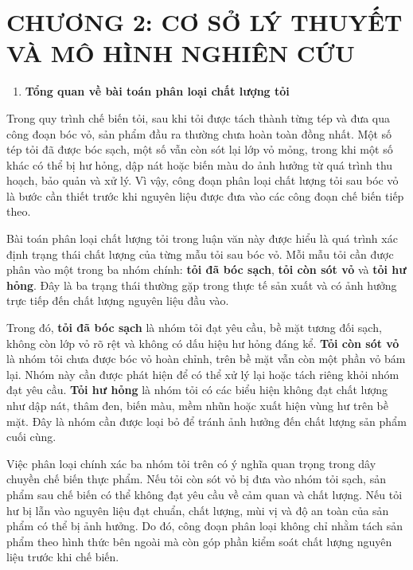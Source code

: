 \documentclass[
]{article}
\begin{document}
\section{\texorpdfstring{CHƯƠNG 2: CƠ SỞ LÝ THUYẾT VÀ MÔ HÌNH NGHIÊN CỨU
}{CHƯƠNG 2: CƠ SỞ LÝ THUYẾT VÀ MÔ HÌNH NGHIÊN CỨU }}\label{chux1b0ux1a1ng-2-cux1a1-sux1edf-luxfd-thuyux1ebft-vuxe0-muxf4-huxecnh-nghiuxean-cux1ee9u}

\begin{enumerate}
\def\labelenumi{\arabic{enumi}.}
\item
  \protect{}\label{_Toc232111997}{}\textbf{Tổng quan về bài
  toán phân loại chất lượng tỏi}
\end{enumerate}

Trong quy trình chế biến tỏi, sau khi tỏi được tách thành từng tép và
đưa qua công đoạn bóc vỏ, sản phẩm đầu ra thường chưa hoàn toàn đồng
nhất. Một số tép tỏi đã được bóc sạch, một số vẫn còn sót lại lớp vỏ
mỏng, trong khi một số khác có thể bị hư hỏng, dập nát hoặc biến màu do
ảnh hưởng từ quá trình thu hoạch, bảo quản và xử lý. Vì vậy, công đoạn
phân loại chất lượng tỏi sau bóc vỏ là bước cần thiết trước khi nguyên
liệu được đưa vào các công đoạn chế biến tiếp theo.

Bài toán phân loại chất lượng tỏi trong luận văn này được hiểu là quá
trình xác định trạng thái chất lượng của từng mẫu tỏi sau bóc vỏ. Mỗi
mẫu tỏi cần được phân vào một trong ba nhóm chính: \textbf{tỏi đã bóc
sạch}, \textbf{tỏi còn sót vỏ} và \textbf{tỏi hư hỏng}. Đây là ba trạng
thái thường gặp trong thực tế sản xuất và có ảnh hưởng trực tiếp đến
chất lượng nguyên liệu đầu vào.

Trong đó, \textbf{tỏi đã bóc sạch} là nhóm tỏi đạt yêu cầu, bề mặt tương
đối sạch, không còn lớp vỏ rõ rệt và không có dấu hiệu hư hỏng đáng kể.
\textbf{Tỏi còn sót vỏ} là nhóm tỏi chưa được bóc vỏ hoàn chỉnh, trên bề
mặt vẫn còn một phần vỏ bám lại. Nhóm này cần được phát hiện để có thể
xử lý lại hoặc tách riêng khỏi nhóm đạt yêu cầu. \textbf{Tỏi hư hỏng} là
nhóm tỏi có các biểu hiện không đạt chất lượng như dập nát, thâm đen,
biến màu, mềm nhũn hoặc xuất hiện vùng hư trên bề mặt. Đây là nhóm cần
được loại bỏ để tránh ảnh hưởng đến chất lượng sản phẩm cuối cùng.

Việc phân loại chính xác ba nhóm tỏi trên có ý nghĩa quan trọng trong
dây chuyền chế biến thực phẩm. Nếu tỏi còn sót vỏ bị đưa vào nhóm tỏi
sạch, sản phẩm sau chế biến có thể không đạt yêu cầu về cảm quan và chất
lượng. Nếu tỏi hư bị lẫn vào nguyên liệu đạt chuẩn, chất lượng, mùi vị
và độ an toàn của sản phẩm có thể bị ảnh hưởng. Do đó, công đoạn phân
loại không chỉ nhằm tách sản phẩm theo hình thức bên ngoài mà còn góp
phần kiểm soát chất lượng nguyên liệu trước khi chế biến.
\end{document}
